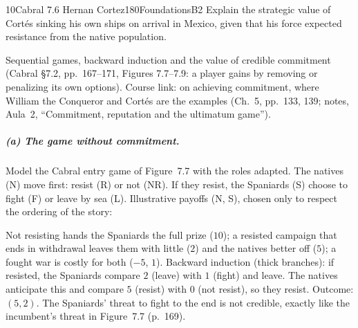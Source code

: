 \begin{exsol}{10}{Cabral 7.6 Hernan Cortez}{180}{Foundations}{B2}
\asked Explain the strategic value of Cort\'es sinking his own ships on arrival in Mexico, given
that his force expected resistance from the native population.

\method Sequential games, backward induction and the value of credible commitment (Cabral
\S7.2, pp.~167--171, Figures 7.7--7.9: a player gains by removing or penalizing its own options).
Course link: \MR{} on achieving commitment, where William the Conqueror and Cort\'es are the
examples (Ch.~5, pp.~133, 139; notes, Aula~2, ``Commitment, reputation and the ultimatum
game'').

\solution
\subparagraph{(a) The game without commitment.} Model the Cabral entry game of Figure~7.7 with
the roles adapted. The natives (N) move first: resist (R) or not (NR). If they resist, the
Spaniards (S) choose to fight (F) or leave by sea (L). Illustrative payoffs (N, S), chosen only
to respect the ordering of the story:
\begin{center}
\end{center}
Not resisting hands the Spaniards the full prize ($10$); a resisted campaign that ends in
withdrawal leaves them with little ($2$) and the natives better off ($5$); a fought war is costly
for both ($-5$, $1$). Backward induction (thick branches): if resisted, the Spaniards compare
$2$ (leave) with $1$ (fight) and leave. The natives anticipate this and compare $5$ (resist) with
$0$ (not resist), so they resist. Outcome: $(5,2)$. The Spaniards' threat to fight to the end is
not credible, exactly like the incumbent's threat in Figure~7.7 (p.~169).


\end{exsol}
